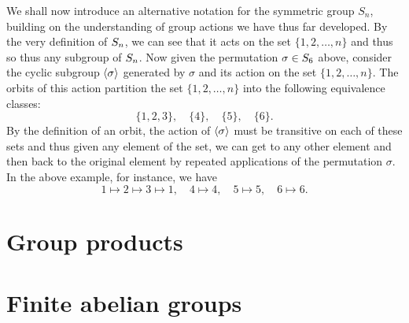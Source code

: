 We shall now introduce an alternative notation for the symmetric group \(S_n\),
building on the understanding of group actions we have thus far developed. By
the very definition of \(S_{n}\), we can see that it acts on the set \(\{1,
2, \ldots, n\}\) and thus so thus any subgroup of \(S_{n}\). Now given the
permutation \(\sigma \in S_{6}\) above, consider the cyclic subgroup
\(\langle \sigma \rangle\) generated by \(\sigma\) and its action on the set \(\{1, 2,
\ldots, n\}\). The orbits of this action partition the set \(\{1, 2, \ldots,
n\}\) into  the following equivalence classes:
\[
    \{1, 2, 3\}, \quad \{4\}, \quad \{5\}, \quad \{6\}.
\]
By the definition of an orbit, the action of \(\langle \sigma \rangle\) must be transitive
on each of these sets and thus given any element of the set, we can get to any
other element and then back to the original element by repeated applications of
the permutation \(\sigma\). In the above example, for instance, we have
\[
    1 \mapsto 2 \mapsto 3 \mapsto 1, \quad 4 \mapsto 4, \quad 5 \mapsto 5, \quad 6 \mapsto 6.
\]
\section{Group products}

\section{Finite abelian groups}